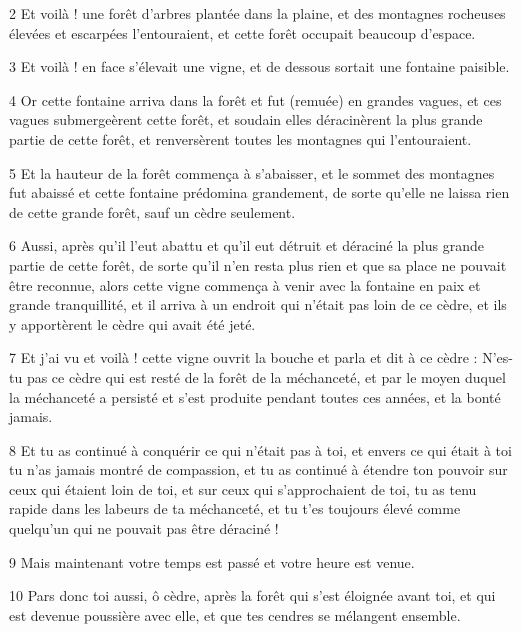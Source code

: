 \par 2 Et voilà ! une forêt d'arbres plantée dans la plaine, et des montagnes rocheuses élevées et escarpées l'entouraient, et cette forêt occupait beaucoup d'espace.

\par 3 Et voilà ! en face s'élevait une vigne, et de dessous sortait une fontaine paisible.

\par 4 Or cette fontaine arriva dans la forêt et fut (remuée) en grandes vagues, et ces vagues submergeèrent cette forêt, et soudain elles déracinèrent la plus grande partie de cette forêt, et renversèrent toutes les montagnes qui l'entouraient.

\par 5 Et la hauteur de la forêt commença à s'abaisser, et le sommet des montagnes fut abaissé et cette fontaine prédomina grandement, de sorte qu'elle ne laissa rien de cette grande forêt, sauf un cèdre seulement.

\par 6 Aussi, après qu'il l'eut abattu et qu'il eut détruit et déraciné la plus grande partie de cette forêt, de sorte qu'il n'en resta plus rien et que sa place ne pouvait être reconnue, alors cette vigne commença à venir avec la fontaine en paix et grande tranquillité, et il arriva à un endroit qui n'était pas loin de ce cèdre, et ils y apportèrent le cèdre qui avait été jeté.

\par 7 Et j'ai vu et voilà ! cette vigne ouvrit la bouche et parla et dit à ce cèdre : N'es-tu pas ce cèdre qui est resté de la forêt de la méchanceté, et par le moyen duquel la méchanceté a persisté et s'est produite pendant toutes ces années, et la bonté jamais.

\par 8 Et tu as continué à conquérir ce qui n'était pas à toi, et envers ce qui était à toi tu n'as jamais montré de compassion, et tu as continué à étendre ton pouvoir sur ceux qui étaient loin de toi, et sur ceux qui s'approchaient de toi, tu as tenu rapide dans les labeurs de ta méchanceté, et tu t'es toujours élevé comme quelqu'un qui ne pouvait pas être déraciné !

\par 9 Mais maintenant votre temps est passé et votre heure est venue.

\par 10 Pars donc toi aussi, ô cèdre, après la forêt qui s'est éloignée avant toi, et qui est devenue poussière avec elle, et que tes cendres se mélangent ensemble.

